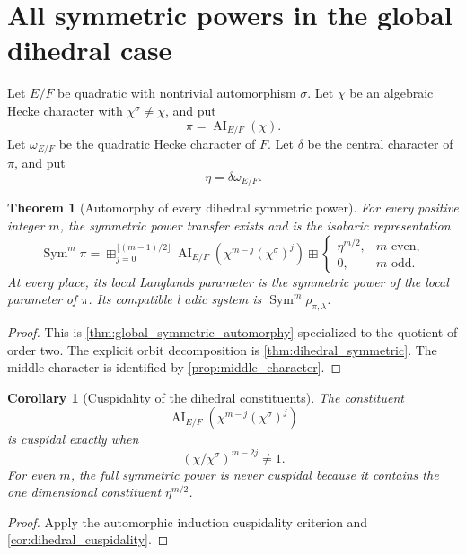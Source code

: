 \documentclass{aomart}
\newtheorem{theorem}{Theorem}[section]
\newtheorem{corollary}[corollary]{Corollary}
\theoremstyle{definition}
\theoremstyle{remark}
\newcommand{\AI}{\operatorname{AI}}
\newcommand{\Sym}{\operatorname{Sym}}
\newcommand{\boxplusop}{\mathbin{\boxplus}}
\begin{document}
\section{All symmetric powers in the global dihedral case}\label{sec:global_dihedral}

Let \(E/F\) be quadratic with nontrivial automorphism \(\sigma\). Let \(\chi\) be an algebraic Hecke character with \(\chi^\sigma\neq\chi\), and put
\[
\pi=\AI_{E/F}(\chi).
\]
Let \(\omega_{E/F}\) be the quadratic Hecke character of \(F\). Let \(\delta\) be the central character of \(\pi\), and put
\[
\eta=\delta\omega_{E/F}.
\]

\begin{theorem}[Automorphy of every dihedral symmetric power]\label{thm:global_dihedral_symmetric}
For every positive integer \(m\), the symmetric power transfer exists and is the isobaric representation
\[
\boxed{
\Sym^m\pi
=
\boxplusop_{j=0}^{\lfloor(m-1)/2\rfloor}
\AI_{E/F}
\left(
\chi^{m-j}(\chi^\sigma)^j
\right)
\mathbin{\boxplusop}
\begin{cases}
\eta^{m/2},&m\text{ even},\\
0,&m\text{ odd}.
\end{cases}
}
\]
At every place, its local Langlands parameter is the symmetric power of the local parameter of \(\pi\). Its compatible l adic system is \(\Sym^m\rho_{\pi,\lambda}\).
\end{theorem}

\begin{proof}
This is \cref{thm:global_symmetric_automorphy} specialized to the quotient of order two. The explicit orbit decomposition is \cref{thm:dihedral_symmetric}. The middle character is identified by \cref{prop:middle_character}.
\end{proof}

\begin{corollary}[Cuspidality of the dihedral constituents]\label{cor:global_dihedral_cuspidality}
The constituent
\[
\AI_{E/F}
\left(
\chi^{m-j}(\chi^\sigma)^j
\right)
\]
is cuspidal exactly when
\[
\boxed{
\left(\chi/\chi^\sigma\right)^{m-2j}\neq 1.
}
\]
For even \(m\), the full symmetric power is never cuspidal because it contains the one dimensional constituent \(\eta^{m/2}\).
\end{corollary}

\begin{proof}
Apply the automorphic induction cuspidality criterion and \cref{cor:dihedral_cuspidality}.
\end{proof}
\end{document}

